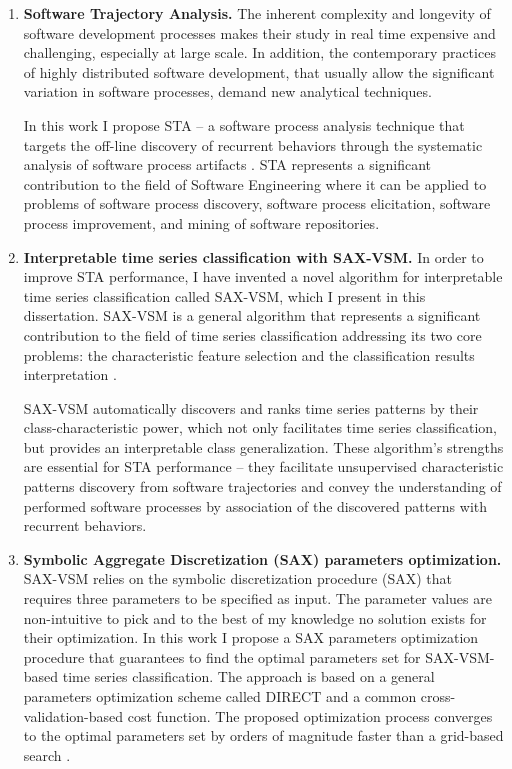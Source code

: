 \begin{enumerate}

\item \textbf{Software Trajectory Analysis.}
The inherent complexity and longevity of software development processes makes their study in real time
expensive and challenging, especially at large scale. 
In addition, the contemporary practices of highly distributed software development, that usually allow 
the significant variation in software processes, demand new analytical techniques.

In this work I propose STA -- a software process analysis technique that targets the off-line discovery 
of recurrent behaviors through the systematic analysis of software process artifacts \cite{csdl2-10-09} \cite{csdl2-11-10}. 
STA represents a significant contribution to the field of Software Engineering where it can be 
applied to problems of software process discovery, software process elicitation, 
software process improvement, and mining of software repositories.

\item \textbf{Interpretable time series classification with SAX-VSM.}
In order to improve STA performance, I have invented a novel algorithm for interpretable time 
series classification called SAX-VSM, which I present in this dissertation. 
SAX-VSM is a general algorithm that represents a significant contribution to the field of 
time series classification addressing its two core problems: 
the characteristic feature selection and the classification results interpretation \cite{sax-vsm}. 

SAX-VSM  automatically discovers and ranks time series patterns by their class-characteristic power, 
which not only facilitates time series classification, but provides an interpretable class generalization.
These algorithm's strengths are essential for STA performance -- they facilitate unsupervised characteristic 
patterns discovery from software trajectories and convey the understanding of performed software processes 
by association of the discovered patterns with recurrent behaviors.

\item \textbf{Symbolic Aggregate Discretization (SAX) parameters optimization.}
SAX-VSM relies on the symbolic discretization procedure (SAX) that requires three parameters to be specified as input. 
The parameter values are non-intuitive to pick and to the best of my knowledge no solution exists for their optimization.
In this work I propose a SAX parameters optimization procedure that guarantees to find the optimal parameters set
for SAX-VSM-based time series classification. The approach is based on a general parameters optimization scheme called 
DIRECT \cite{citeulike:12563460} and a common cross-validation-based cost function. 
The proposed optimization process converges to the optimal parameters set by orders of 
magnitude faster than a grid-based search \cite{sax-vsm}.


\end{enumerate}
